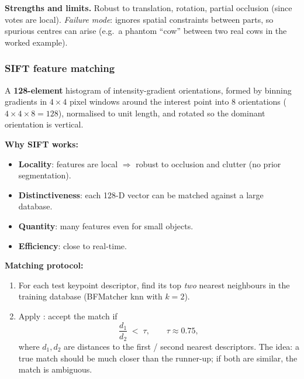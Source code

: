 \textbf{Strengths and limits.}
Robust to translation, rotation, partial occlusion (since votes are local). \emph{Failure mode}: ignores spatial constraints between parts, so spurious centres can arise (e.g.\ a phantom ``cow'' between two real cows in the worked example).

\bigseparator

\subsubsection{SIFT feature matching}

\begin{defbox}
A \textbf{128-element} histogram of intensity-gradient orientations, formed by binning gradients in $4\times 4$ pixel windows around the interest point into 8 orientations ($4\times 4\times 8 = 128$), normalised to unit length, and rotated so the dominant orientation is vertical.
\end{defbox}

\textbf{Why SIFT works:}
\begin{itemize}
  \item \textbf{Locality}: features are local $\Rightarrow$ robust to occlusion and clutter (no prior segmentation).
  \item \textbf{Distinctiveness}: each 128-D vector can be matched against a large database.
  \item \textbf{Quantity}: many features even for small objects.
  \item \textbf{Efficiency}: close to real-time.
\end{itemize}

\separator

\textbf{Matching protocol:}
\begin{enumerate}
  \item For each test keypoint descriptor, find its top \emph{two} nearest neighbours in the training database (BFMatcher knn with $k=2$).
  \item Apply : accept the match if
  \[
  \frac{d_1}{d_2} \;<\; \tau, \qquad \tau \approx 0.75,
  \]
  where $d_1, d_2$ are distances to the first / second nearest descriptors. The idea: a true match should be much closer than the runner-up; if both are similar, the match is ambiguous.
\end{enumerate}

\separator

